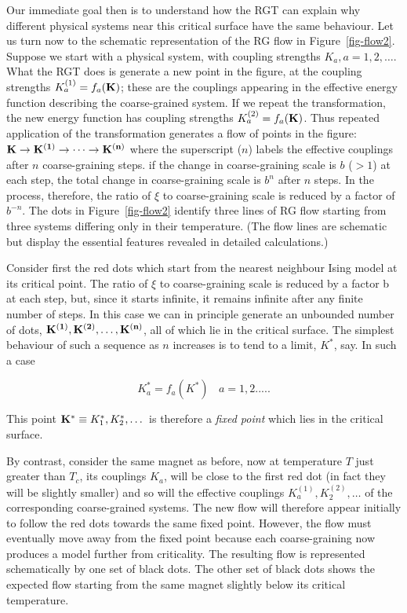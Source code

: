 \documentclass[
  letterpaper,
  enabledeprecatedfontcommands]{report}
\begin{document}
Our immediate goal then is to understand how the RGT can explain why
different physical systems near this critical surface have the same
behaviour. Let us turn now to the schematic representation of the RG
flow in Figure~\ref{fig-flow2}. Suppose we start with a physical system,
with coupling strengths \(K_a,  a= 1,2, \dots\). What the RGT does is
generate a new point in the figure, at the coupling strengths
\(K_a^{(1)}=f_a({\bf K})\); these are the couplings appearing in the
effective energy function describing the coarse-grained system. If we
repeat the transformation, the new energy function has coupling
strengths \(K_a^{(2)}=f_a({\bf K})\). Thus repeated application of the
transformation generates a flow of points in the figure: \({\bf K\to
K^{(1)}\to\dots\to K^{(n)}}\) where the superscript (\(n\)) labels the
effective couplings after \(n\) coarse-graining steps. if the change in
coarse-graining scale is \(b\) (\(> 1\)) at each step, the total change
in coarse-graining scale is \(b^n\) after \(n\) steps. In the process,
therefore, the ratio of \(\xi\) to coarse-graining scale is reduced by a
factor of \(b^{-n}\). The dots in Figure~\ref{fig-flow2} identify three
lines of RG flow starting from three systems differing only in their
temperature. (The flow lines are schematic but display the essential
features revealed in detailed calculations.)

Consider first the red dots which start from the nearest neighbour Ising
model at its critical point. The ratio of \(\xi\) to coarse-graining
scale is reduced by a factor b at each step, but, since it starts
infinite, it remains infinite after any finite number of steps. In this
case we can in principle generate an unbounded number of dots,
\({\bf K^{(1)}, K^{(2)},\dots,K^{(n)}}\), all of which lie in the
critical surface. The simplest behaviour of such a sequence as \(n\)
increases is to tend to a limit, \(K^*\), say. In such a case

\[K^*_a=f_a(K^*)~~~~ a= 1,2 .....\]

This point \({\bf K^*} \equiv K_1^*, K_2^*, \dots\) is therefore a
\emph{fixed point} which lies in the critical surface.

By contrast, consider the same magnet as before, now at temperature
\(T\) just greater than \(T_c\), its couplings \(K_a\), will be close to
the first red dot (in fact they will be slightly smaller) and so will
the effective couplings \(K_a^{(1)},K_2^{(2)},\dots\) of the
corresponding coarse-grained systems. The new flow will therefore appear
initially to follow the red dots towards the same fixed point. However,
the flow must eventually move away from the fixed point because each
coarse-graining now produces a model further from criticality. The
resulting flow is represented schematically by one set of black dots.
The other set of black dots shows the expected flow starting from the
same magnet slightly below its critical temperature.
\end{document}
